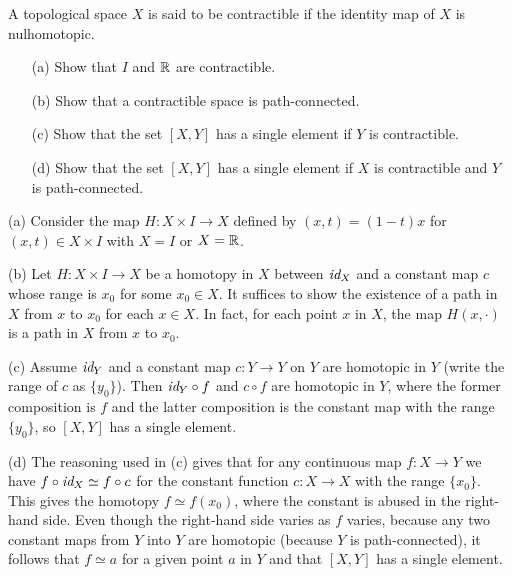 \begin{prob}
    A topological space $X$ is said to be contractible if the identity map of $X$ is nulhomotopic.
    \begin{enumerate}
        \item[(a)]
        {
            Show that $I$ and ${\mathbb{R}}$ are contractible.
        }
        \item[(b)]
        {
            Show that a contractible space is path-connected.
        }
        \item[(c)]
        {
            Show that the set $[X, Y]$ has a single element if $Y$ is contractible.
        }
        \item[(d)]
        {
            Show that the set $[X, Y]$ has a single element if $X$ is contractible and $Y$ is path-connected.
        }
    \end{enumerate}
\end{prob}
\begin{sol}
    \hangindent=0.65cm
    \noindent(a)
    Consider the map $H: X\times I\rightarrow X$ defined by $(x, t)=(1-t)x$ for $(x, t)\in X\times I$ with $X=I$ or $X={\mathbb{R}}$.

    \noindent(b)
    Let $H: X\times I\rightarrow X$ be a homotopy in $X$ between $\textit{id}_{X}$ and a constant map $c$ whose range is $x_0$ for some $x_0\in X$.
    It suffices to show the existence of a path in $X$ from $x$ to $x_0$ for each $x\in X$.
    In fact, for each point $x$ in $X$, the map $H(x, \cdot)$ is a path in $X$ from $x$ to $x_0$.

    \noindent(c)
    Assume $\textit{id}_{Y}$ and a constant map $c: Y\rightarrow Y$ on $Y$ are homotopic in $Y$ (write the range of $c$ as $\{y_0\}$).
    Then $\textit{id}_{Y}\circ f$ and $c\circ f$ are homotopic in $Y$, where the former composition is $f$ and the latter composition is the constant map with the range $\{y_0\}$, so $[X, Y]$ has a single element.

    \noindent(d)
    The reasoning used in (c) gives that for any continuous map $f: X\rightarrow Y$ we have $f\circ\textit{id}_{X}\simeq f\circ c$ for the constant function $c: X\rightarrow X$ with the range $\{x_0\}$.
    This gives the homotopy $f\simeq f(x_0)$, where the constant is abused in the right-hand side.
    Even though the right-hand side varies as $f$ varies, because any two constant maps from $Y$ into $Y$ are homotopic (because $Y$ is path-connected), it follows that $f\simeq a$ for a given point $a$ in $Y$ and that $[X, Y]$ has a single element.
\end{sol}